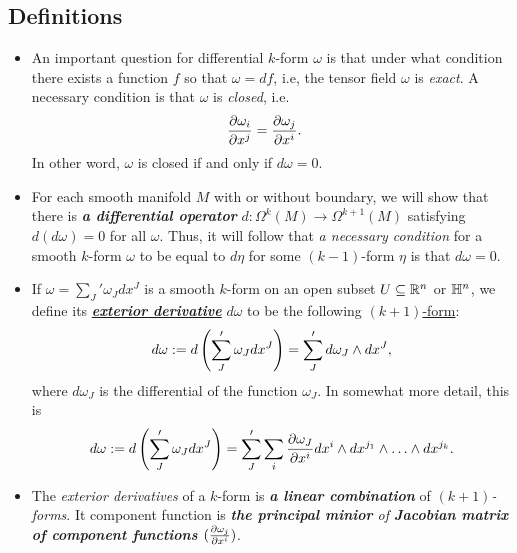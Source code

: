 \documentclass[11pt]{article}
\begin{document}
\subsection{Definitions}
\begin{itemize}
\item \begin{remark}
An important question for differential $k$-form $\omega$ is that under what condition there exists a function $f$ so that $\omega = df$, i.e, the tensor field $\omega$ is \emph{exact}. A necessary condition is that $\omega$ is \emph{closed}, i.e.
\begin{align*}
\frac{\partial \omega_i}{ \partial x^{j}} &= \frac{\partial \omega_j}{ \partial x^{i}}.
\end{align*} In other word, $\omega$ is closed if and only if $d\omega = 0$.
\end{remark}

\item \begin{remark}
For each smooth manifold $M$ with or without boundary, we will show that there is \emph{\textbf{a differential operator}} $d: \Omega^k(M) \rightarrow \Omega^{k+1}(M)$ satisfying $d(d\omega) = 0$ for all $\omega$.  Thus, it will follow that \emph{a necessary condition} for a smooth
$k$-form $\omega$ to be equal to $d\eta$ for some $(k-1)$-form $\eta$ is that $d\omega = 0$.
\end{remark}

\item \begin{definition}
If $\omega = \sum_{J}'\omega_J dx^J$ is a smooth $k$-form on an open subset $U\subseteq {\mathbb R}^n$ or ${\mathbb H}^n$, we define its \underline{\emph{\textbf{exterior derivative}}} $d\omega$ to be the following \underline{$(k+1)$-form}:
\begin{align}
d\omega := d\left(\sum_{J}'\omega_J dx^J\right) =\sum_{J}' d\omega_J \wedge dx^{J},  \label{eqn: exterior_derivatives_def_0}
\end{align}
where $d\omega_J$ is the differential of the function $\omega_J$. In somewhat more detail, this is
\begin{align}
d\omega := d\left(\sum_{J}'\omega_J dx^J\right) = \sum_{J}'\sum_{i}\frac{\partial \omega_{J}}{ \partial x^i} dx^i \wedge dx^{j_1} \wedge \ldots \wedge dx^{j_k}. \label{eqn: exterior_derivatives_def_1}
\end{align}
\end{definition}

\item \begin{remark}
The \emph{exterior derivatives} of a $k$-form is \emph{\textbf{a linear combination}} of \emph{$(k+1)$-forms}. It component function is  \emph{\textbf{the principal minior} of \textbf{Jacobian matrix of component functions} $(\frac{\partial \omega_j}{ \partial x^i})$}.
\end{remark}


\end{itemize}
\end{document}
